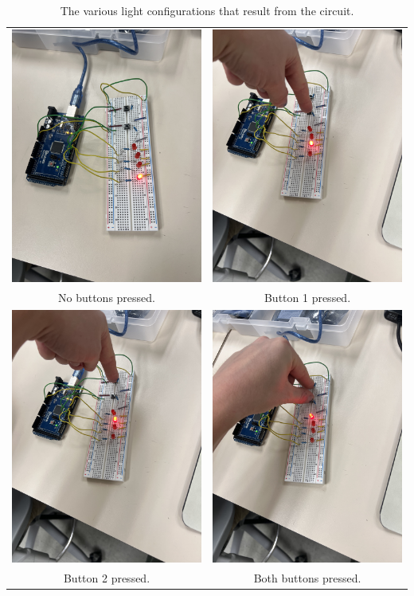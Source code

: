 \documentclass{article}
\begin{document}
\begin{table}[]
    \centering
    \begin{tabular}{|c|c|}
         \hline
            \includegraphics[width=0.28\linewidth]{default.jpg} &
            \includegraphics[width=0.28\linewidth]{led-1.jpg}
            \\
            No buttons pressed.&
            Button 1 pressed.
            \\
        \hline
            \includegraphics[width=0.28\linewidth]{led-2.jpg}&
            \includegraphics[width=0.28\linewidth]{led-3.jpg} 
            \\
            Button 2 pressed.&
            Both buttons pressed.
            \\
        \hline
    \end{tabular}
    \caption{The various light configurations that result from the circuit.}
    \label{tab:light-configs}
\end{table}
\end{document}
